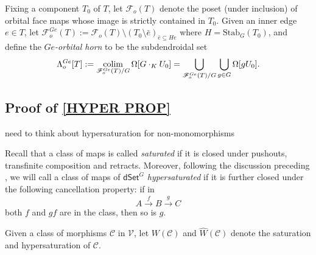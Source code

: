 \documentclass[a4paper,10p,draft]{article}%
\numberwithin{equation}{section}%
\begin{document}
\begin{definition}
Fixing a component $T_0$ of $T$,
      let $\mathscr{F}_{o}(T)$ denote the poset (under inclusion) of orbital face maps whose image is
      strictly contained in $T_0$.
      Given an inner edge $e \in T$, let
      $\mathscr{F}_{o}^{Ge}(T) := \mathscr{F}_{o}(T) \setminus (T_0\setminus \bar{e})_{\bar e \subseteq H e}$
      where $H = \mathrm{Stab}_G(T_0)$,
      and define the \textit{$Ge$-orbital horn} to be the subdendroidal set
      \begin{equation}
            \Lambda^{Ge}_{o}[T] := \mathop{\operatorname{colim}}\limits_{\mathscr{F}_{o}^{Ge}(T)/G}\Omega[G\cdot_K U_0]
            =\mathop{\bigcup}\limits_{\mathscr{F}_o^{Ge}(T)/G} \mathop{\bigcup}\limits_{g \in G}\Omega[g U_0]. 
      \end{equation}
\end{definition}



\subsection{Proof of \ref{HYPER PROP}}


{\color{red} need to think about hypersaturation for non-monomorphisms}

Recall that a class of maps is called \textit{saturated}
if it is closed under pushouts, transfinite composition and retracts.
Moreover, following the discussion preceding \cite[Prop. 3.6.8]{HHM16}, we will call a class of maps of $\mathsf{dSet}^G$ \textit{hypersaturated} if it is further closed under the following cancellation property: if in
\[
A \xrightarrow{f} B \xrightarrow{g} C
\]
both $f$ and $gf$ are in the class, then so is $g$.

\begin{notation}
      Given a class of morphisms $\mathcal{C}$ in $\mathcal V$, let
      $W(\mathcal C)$ and $\hat{W}(\mathcal C)$ denote
      the saturation and hypersaturation of $\mathcal C$. 
\end{notation}
\end{document}

